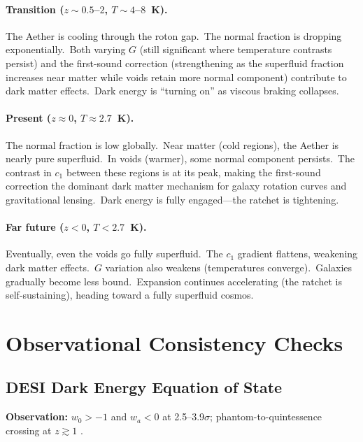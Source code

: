 \documentclass[12pt,letterpaper]{article}
\begin{document}
\paragraph{Transition ($z \sim 0.5$--$2$, $T \sim 4$--$8$~K).}
The Aether is cooling through the roton gap.\ The normal fraction is dropping
exponentially.\ Both varying $G$ (still significant where temperature contrasts
persist) and the first-sound correction (strengthening as the superfluid
fraction increases near matter while voids retain more normal component)
contribute to dark matter effects.\ Dark energy is ``turning on'' as viscous
braking collapses.

\paragraph{Present ($z \approx 0$, $T \approx 2.7$~K).}
The normal fraction is low globally.\ Near matter (cold regions), the Aether
is nearly pure superfluid.\ In voids (warmer), some normal component persists.\
The contrast in $c_1$ between these regions is at its peak, making the
first-sound correction the dominant dark matter mechanism for galaxy rotation
curves and gravitational lensing.\ Dark energy is fully engaged---the ratchet
is tightening.

\paragraph{Far future ($z < 0$, $T < 2.7$~K).}
Eventually, even the voids go fully superfluid.\ The $c_1$ gradient flattens,
weakening dark matter effects.\ $G$ variation also weakens (temperatures
converge).\ Galaxies gradually become less bound.\ Expansion continues
accelerating (the ratchet is self-sustaining), heading toward a fully superfluid
cosmos.


\section{Observational Consistency Checks}
\label{sec:checks}

\subsection{DESI Dark Energy Equation of State}

\textbf{Observation:} $w_0 > -1$ and $w_a < 0$ at 2.5--3.9$\sigma$; phantom-to-quintessence crossing at $z \gtrsim 1$ \cite{desi2025}.
\end{document}
